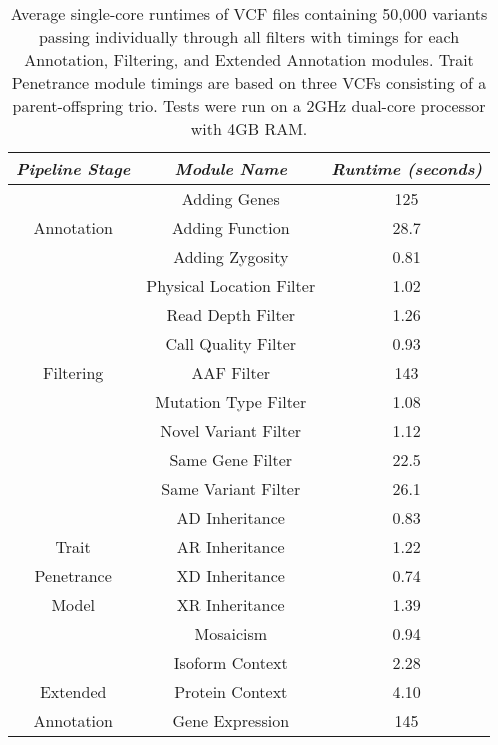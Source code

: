 \documentclass[twocolumn]{bmcart}%
\begin{document}
\begin{backmatter}
\begin{table}[h!]
\begin{tabular}{| c | *2c |} \hline %
\emph{Pipeline Stage} & \emph{Module Name} & \emph{Runtime (seconds)} \\
\hline
             & Adding Genes     & 125\\
Annotation   & Adding Function & 28.7\\
             & Adding Zygosity & 0.81\\
\hline
             & Physical Location Filter & 1.02 \\
             & Read Depth Filter        & 1.26 \\
             & Call Quality Filter      & 0.93\\
Filtering    & AAF Filter               & 143\\
             & Mutation Type Filter     & 1.08\\
             & Novel Variant Filter     & 1.12\\
             & Same Gene Filter       & 22.5\\
             & Same Variant Filter    & 26.1\\
\hline
             & AD Inheritance    & 0.83\\
 Trait       & AR Inheritance    & 1.22\\
Penetrance   & XD Inheritance    & 0.74\\
  Model      & XR Inheritance    & 1.39\\
             & Mosaicism         & 0.94\\
\hline
                 & Isoform Context      & 2.28\\
   Extended      & Protein Context      & 4.10\\
 Annotation      & Gene Expression      & 145\\
\hline
\end{tabular}
\vspace{1ex}
\caption{Average single-core runtimes of VCF files containing 50,000 variants passing individually through all filters with timings for each Annotation, Filtering, and Extended Annotation modules. Trait Penetrance module timings are based on three VCFs consisting of a parent-offspring trio. Tests were run on a 2GHz dual-core processor with 4GB RAM.}\label{table:results}
\end{table}





\end{backmatter}
\end{document}
